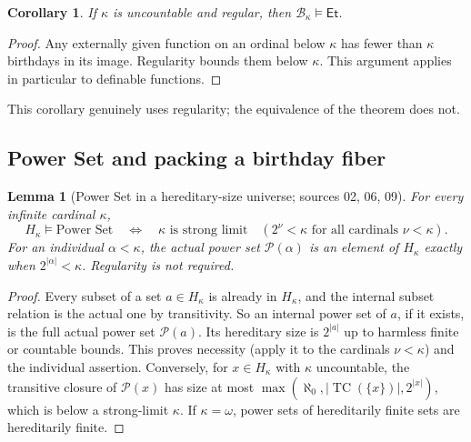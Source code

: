 \documentclass[11pt,letterpaper]{article}
\newtheorem{lemma}[lemma]{Lemma}\aliascntresetthe{lemma}
\newtheorem{corollary}[corollary]{Corollary}\aliascntresetthe{corollary}
\theoremstyle{definition}
\theoremstyle{remark}
\newcommand{\TC}{\operatorname{TC}}
\newcommand{\B}{\mathcal B}
\newcommand{\Et}{\mathsf{Et}}
\newcommand{\Pow}{\mathcal P}
\newcommand{\card}[1]{\lvert#1\rvert}
\begin{document}
\begin{corollary}\label{hset:cor:regular-eternity}
If $\kappa$ is uncountable and regular, then $\B_\kappa\models\Et$.
\end{corollary}
\begin{proof}
Any externally given function on an ordinal below $\kappa$ has fewer than
$\kappa$ birthdays in its image. Regularity bounds them below $\kappa$.
This argument applies in particular to definable functions.
\end{proof}

This corollary genuinely uses regularity; the equivalence of the theorem does
not.

\subsection{Power Set and packing a birthday fiber}

\begin{lemma}[Power Set in a hereditary-size universe; sources 02, 06, 09]
\label{hset:lem:Hpower}\label{hset:prop:powerset}
For every infinite cardinal $\kappa$,
\[
 H_\kappa\models\text{Power Set}
 \quad\Longleftrightarrow\quad
 \kappa\text{ is strong limit}\quad(2^\nu<\kappa\text{ for all cardinals }\nu<\kappa).
\]
For an individual $\alpha<\kappa$, the actual power set $\Pow(\alpha)$ is
an element of $H_\kappa$ exactly when $2^{\card\alpha}<\kappa$. Regularity is
not required.
\end{lemma}
\begin{proof}
Every subset of a set $a\in H_\kappa$ is already in $H_\kappa$, and the
internal subset relation is the actual one by transitivity. So an internal power
set of $a$, if it exists, is the full actual power set $\Pow(a)$. Its
hereditary size is $2^{\card a}$ up to harmless finite or countable bounds.
This proves necessity (apply it to the cardinals $\nu<\kappa$) and the
individual assertion. Conversely, for $x\in H_\kappa$ with $\kappa$ uncountable,
the transitive closure of $\Pow(x)$ has size at most
$\max(\aleph_0,\card{\TC(\{x\})},2^{\card x})$, which is below a strong-limit
$\kappa$. If $\kappa=\omega$, power sets of hereditarily finite sets are
hereditarily finite.
\end{proof}
\end{document}
